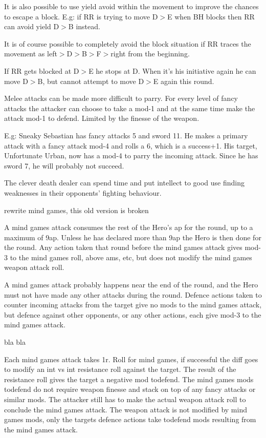 It is also possible to use yield avoid within the movement to improve the chances to escape a block. E.g: if RR is trying to move D$>$E when BH blocks then RR can avoid yield D$>$B instead.

It is of course possible to completely avoid the block situation if RR traces the movement as left$>$D$>$B$>$F$>$right from the beginning.

If RR gets blocked at D$>$E he stops at D. When it's his initiative again he can move D$>$B, but cannot attempt to move D$>$E again this round.


 Melee attacks can be made more difficult to parry. For every level of fancy attacks the attacker can choose to take a mod-1 and at the same time make the attack mod-1 to defend. Limited by the finesse of the weapon.

E.g: Sneaky Sebastian has fancy attacks 5 and sword 11. He makes a primary attack with a fancy attack mod-4 and rolls a 6, which is a success+1. His target, Unfortunate Urban, now has a mod-4 to parry the incoming attack. Since he has sword 7, he will probably not succeed.


 The clever death dealer can spend time and put intellect to good use finding weaknesses in their opponents' fighting behaviour.

\todo rewrite mind games, this old version is broken

\tmpsepline

A mind games attack consumes the rest of the Hero's ap for the round, up to a maximum of 9ap. Unless he has declared more than 9ap the Hero is then done for the round.
Any action taken that round before the mind games attack gives mod-3 to the mind games roll, above ams, etc, but does not modify the mind games weapon attack roll.

A mind games attack probably happens near the end of the round, and the Hero must not have made any other attacks during the round. Defence actions taken to counter incoming attacks from the target give no mods to the mind games attack, but defence against other opponents, or any other actions, each give mod-3 to the mind games attack.

bla bla

\tmpsepline

Each mind games attack takes 1r. Roll for mind games, if successful the diff goes to modify an int vs int resistance roll against the target. The result of the resistance roll gives the target a negative mod todefend. The mind games mods todefend do not require weapon finesse and stack on top of any fancy attacks or similar mods.
The attacker still has to make the actual weapon attack roll to conclude the mind games attack. The weapon attack is not modified by mind games mods, only the targets defence actions take todefend mods resulting from the mind games attack.

